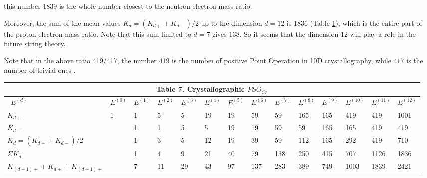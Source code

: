 \documentclass[a4paper,9pt]{article}
\begin{document}
    this number 1839 is the whole number closest to the neutron-electron mass ratio.


    
    Moreover, the sum of the mean values $K_{d} = (K_{d+} + K_{d-})/2$ up to the dimension $d = 12$ is 1836 (Table \ref{tab:10:table10}), which is the entire part of the proton-electron mass ratio. Note that this sum limited to $d = 7$ gives 138. So it seems that the dimension $12$ will play a role in the future string theory.
    
    
    Note that in the  above ratio 419/417, the number $419$ is the number of positive Point Operation in 10D crystallography, while $417$ is the number of trivial ones .

\begin{table}
\label{tab:10:table10}
  \hskip-0.0cm\begin{tabular}{llllllllllllll}
    \toprule
    \multicolumn{14}{c}{Table 7. Crystallographic $PSO_{Cr}$}                  \\
    \cmidrule(r){1-14}
    \midrule
    
     
     
      
      \ $E^{(d)}$ & $E^{(0)}$ & $E^{(1)} $ & $E^{(2)}$ & $E^{(3)} $& $E^{(4)}$ &$ E^{(5)}$ &$ E^{(6)} $&$ E^{(7)}$ &$ E^{(8)}$ & $E^{(9)}$ &$ E^{(10)} $&$ E^{(11)} $&$ E^{(12)}$ \\
    \midrule
    $K_{d+}$  & 1 & 1 & 5 & 5 & 19 & 19 & 59 & 59 & 165 & 165 & 419 & 419 & 1001 \\
    
     $K_{d-}$  &  & 1 & 1 & 5 & 5 & 19 & 19 & 59 & 59 & 165 & 165& 419 & 419 \\
     
      $K_{d} = (K_{d+} + K_{d-})/2$  & & 1 & 3 & 5 & 12 & 19 & 39 & 59 & 112 & 165 & 292 & 419 & 710 \\
      
      $\Sigma K_{d}$ &  & 1 & 4 & 9 & 21 & 40 & 79 & 138 & 250 & 415 & 707 & 1126 & 1836 \\
      
      $K_{(d-1)+} +K_{d+}+ K_{(d+1)+}$  &  & 7 & 11 & 29 & 43 & 97 & 137 & 283 & 389 & 749 & 1003 & 1839 & 2421 \\

      

    \bottomrule
  \end{tabular}
\end{table}
    
\end{document}
